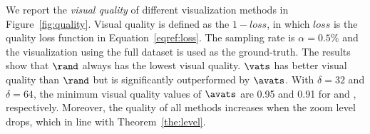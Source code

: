  We report the \textit{visual quality} of different visualization methods in Figure~\ref{fig:quality}. Visual quality is defined as the $1-loss$, in which $loss$ is the quality loss function in Equation~\eqref{eqref:loss}. The sampling rate is $\alpha=0.5\%$ and the visualization using the full dataset is used as the ground-truth. The results show that $\rand$ always has the lowest  visual quality. $\vats$ has better visual quality than $\rand$ but is significantly outperformed by $\avats$. With $\delta=32$ and $\delta=64$, the minimum visual quality values of $\avats$ are 0.95 and 0.91 for \pt{} and \sz{}, respectively. Moreover, the quality of all methods increases when the zoom level drops, which in line with Theorem~\ref{the:level}.




